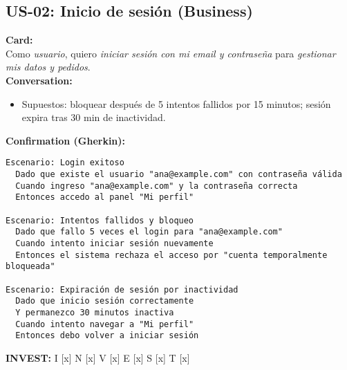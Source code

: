 \documentclass[11pt]{article}
\begin{document}
\subsection*{US-02: Inicio de sesión (Business)}
\begin{tcolorbox}
\textbf{Card:}\\
Como \emph{usuario}, quiero \emph{iniciar sesión con mi email y contraseña} para \emph{gestionar mis datos y pedidos}.\\[3pt]
\textbf{Conversation:}
\begin{itemize}[leftmargin=1.2em]
  \item Supuestos: bloquear después de 5 intentos fallidos por 15 minutos; sesión expira tras 30 min de inactividad.
\end{itemize}
\textbf{Confirmation (Gherkin):}
\begin{verbatim}
Escenario: Login exitoso
  Dado que existe el usuario "ana@example.com" con contraseña válida
  Cuando ingreso "ana@example.com" y la contraseña correcta
  Entonces accedo al panel "Mi perfil"

Escenario: Intentos fallidos y bloqueo
  Dado que fallo 5 veces el login para "ana@example.com"
  Cuando intento iniciar sesión nuevamente
  Entonces el sistema rechaza el acceso por "cuenta temporalmente bloqueada"

Escenario: Expiración de sesión por inactividad
  Dado que inicio sesión correctamente
  Y permanezco 30 minutos inactiva
  Cuando intento navegar a "Mi perfil"
  Entonces debo volver a iniciar sesión
\end{verbatim}
\textbf{INVEST:} I [x] N [x] V [x] E [x] S [x] T [x]
\end{tcolorbox}

\end{document}
